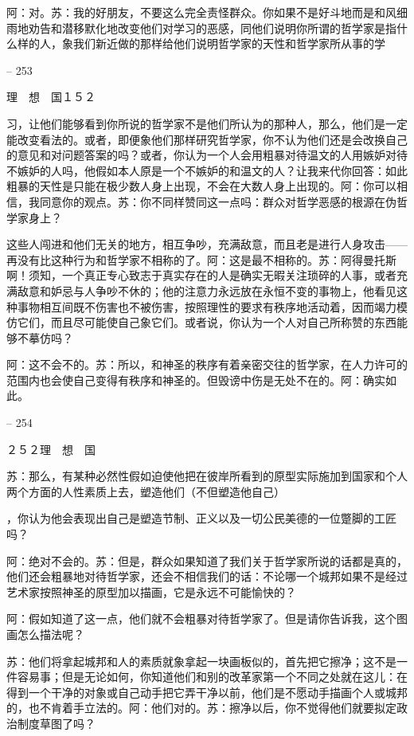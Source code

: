 \documentclass[11pt,oneside]{book}
\begin{document}
\begin{common-format}
    阿：对。苏：我的好朋友，不要这么完全责怪群众。你如果不是好斗地而是和风细雨地劝告和潜移默化地改变他们对学习的恶感，同他们说明你所谓的哲学家是指什么样的人，象我们新近做的那样给他们说明哲学家的天性和哲学家所从事的学

    

-- 253

    理　想　国１５２

    习，让他们能够看到你所说的哲学家不是他们所认为的那种人，那么，他们是一定能改变看法的。或者，即便象他们那样研究哲学家，你不认为他们还是会改换自己的意见和对问题答案的吗？或者，你认为一个人会用粗暴对待温文的人用嫉妒对待不嫉妒的人吗，他假如本人原是一个不嫉妒的和温文的人？让我来代你回答：如此粗暴的天性是只能在极少数人身上出现，不会在大数人身上出现的。阿：你可以相信，我同意你的观点。苏：你不同样赞同这一点吗：群众对哲学恶感的根源在伪哲学家身上？

    这些人闯进和他们无关的地方，相互争吵，充满敌意，而且老是进行人身攻击——再没有比这种行为和哲学家不相称的了。阿：这是最不相称的。苏：阿得曼托斯啊！须知，一个真正专心致志于真实存在的人是确实无暇关注琐碎的人事，或者充满敌意和妒忌与人争吵不休的；他的注意力永远放在永恒不变的事物上，他看见这种事物相互间既不伤害也不被伤害，按照理性的要求有秩序地活动着，因而竭力模仿它们，而且尽可能使自己象它们。或者说，你认为一个人对自己所称赞的东西能够不摹仿吗？

    阿：这不会不的。苏：所以，和神圣的秩序有着亲密交往的哲学家，在人力许可的范围内也会使自己变得有秩序和神圣的。但毁谤中伤是无处不在的。阿：确实如此。

    

-- 254

    ２５２理　想　国

    苏：那么，有某种必然性假如迫使他把在彼岸所看到的原型实际施加到国家和个人两个方面的人性素质上去，塑造他们（不但塑造他自己）

    ，你认为他会表现出自己是塑造节制、正义以及一切公民美德的一位蹩脚的工匠吗？

    阿：绝对不会的。苏：但是，群众如果知道了我们关于哲学家所说的话都是真的，他们还会粗暴地对待哲学家，还会不相信我们的话：不论哪一个城邦如果不是经过艺术家按照神圣的原型加以描画，它是永远不可能愉快的？

    阿：假如知道了这一点，他们就不会粗暴对待哲学家了。但是请你告诉我，这个图画怎么描法呢？

    苏：他们将拿起城邦和人的素质就象拿起一块画板似的，首先把它擦净；这不是一件容易事；但是无论如何，你知道他们和别的改革家第一个不同之处就在这儿：在得到一个干净的对象或自己动手把它弄干净以前，他们是不愿动手描画个人或城邦的，也不肯着手立法的。阿：他们对的。苏：擦净以后，你不觉得他们就要拟定政治制度草图了吗？


\end{common-format}
\end{document}

